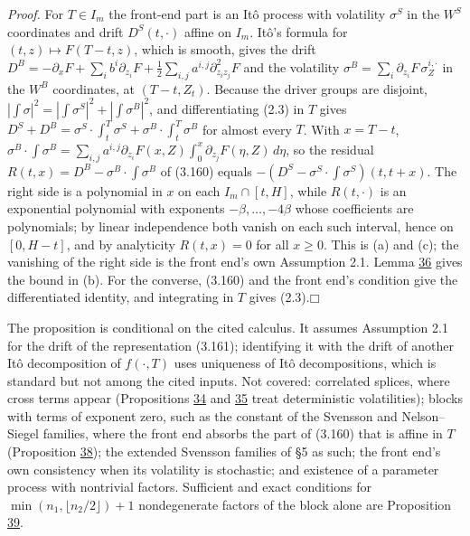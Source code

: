 \documentclass[11pt]{article}
\providecommand{\square}{\mdlgwhtsquare}
\begin{document}
\emph{Proof.} For \(T\in I_m\) the front-end part is an Itô process with volatility \(\sigma^S\) in the \(W^S\) coordinates and drift \(D^S(t,\cdot)\) affine on \(I_m\). Itô's formula for \((t,z)\mapsto F(T-t,z)\), which is smooth, gives the drift \(D^B=-\partial_xF+\sum_ib^i\partial_{z_i}F+\tfrac12\sum_{i,j}a^{i,j}\partial^2_{z_iz_j}F\) and the volatility \(\sigma^B=\sum_i\partial_{z_i}F\,\sigma_Z^{i,\cdot}\) in the \(W^B\) coordinates, at \((T-t,Z_t)\). Because the driver groups are disjoint, \(|\int\sigma|^2=|\int\sigma^S|^2+|\int\sigma^B|^2\), and differentiating (2.3) in \(T\) gives \(D^S+D^B=\sigma^S\cdot\int_t^T\sigma^S+\sigma^B\cdot\int_t^T\sigma^B\) for almost every \(T\). With \(x=T-t\), \(\sigma^B\cdot\int\sigma^B=\sum_{i,j}a^{i,j}\partial_{z_i}F(x,Z)\int_0^x\partial_{z_j}F(\eta,Z)\,d\eta\), so the residual \(R(t,x)=D^B-\sigma^B\cdot\int\sigma^B\) of (3.160) equals \(-(D^S-\sigma^S\cdot\int\sigma^S)(t,t+x)\). The right side is a polynomial in \(x\) on each \(I_m\cap[t,H]\), while \(R(t,\cdot)\) is an exponential polynomial with exponents \(-\beta,\dots,-4\beta\) whose coefficients are polynomials; by linear independence both vanish on each such interval, hence on \([0,H-t]\), and by analyticity \(R(t,x)=0\) for all \(x\ge0\). This is (a) and (c); the vanishing of the right side is the front end's own Assumption 2.1. Lemma \hyperref[res:Lemma-36]{36} gives the bound in (b). For the converse, (3.160) and the front end's condition give the differentiated identity, and integrating in \(T\) gives (2.3).\hfill$\square$

The proposition is conditional on the cited calculus. It assumes Assumption 2.1 for the drift of the representation (3.161); identifying it with the drift of another Itô decomposition of \(f(\cdot,T)\) uses uniqueness of Itô decompositions, which is standard but not among the cited inputs. Not covered: correlated splices, where cross terms appear (Propositions \hyperref[res:Proposition-34]{34} and \hyperref[res:Proposition-35]{35} treat deterministic volatilities); blocks with terms of exponent zero, such as the constant of the Svensson and Nelson--Siegel families, where the front end absorbs the part of (3.160) that is affine in \(T\) (Proposition \hyperref[res:Proposition-38]{38}); the extended Svensson families of \cite{sharef2004conditions} §5 as such; the front end's own consistency when its volatility is stochastic; and existence of a parameter process with nontrivial factors. Sufficient and exact conditions for \(\min(n_1,\lfloor n_2/2\rfloor)+1\) nondegenerate factors of the block alone are Proposition \hyperref[res:Proposition-39]{39}.
\end{document}
